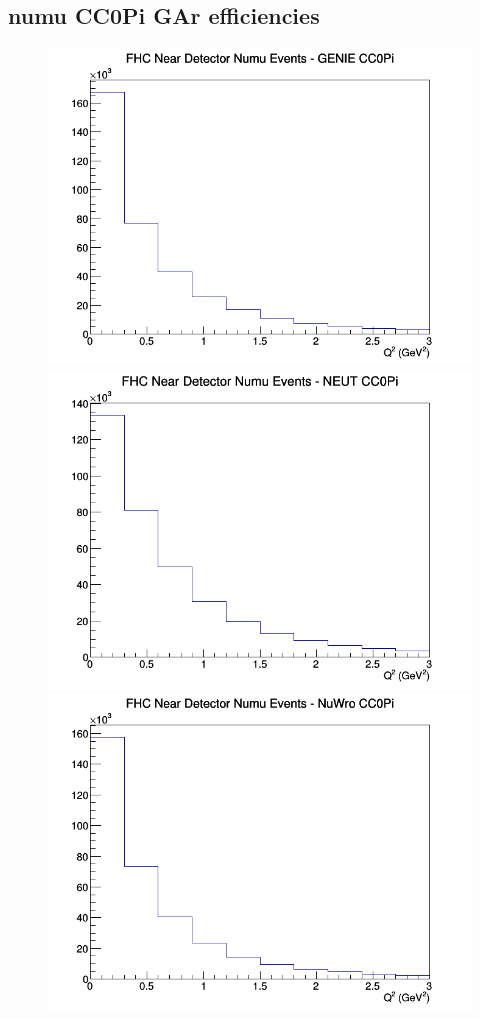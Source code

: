 \subsection{numu CC0Pi GAr efficiencies}
\begin{figure}[h]
\includegraphics[width=\linewidth]{eff_Q2/GAr/CC0Pi_FHC_ND_numu_Q2_GENIE.png}
\endminipage
{}
\includegraphics[width=\linewidth]{eff_Q2/GAr/CC0Pi_FHC_ND_numu_Q2_NEUT.png}
\endminipage
{}
\includegraphics[width=\linewidth]{eff_Q2/GAr/CC0Pi_FHC_ND_numu_Q2_NuWro.png}

\end{figure}
